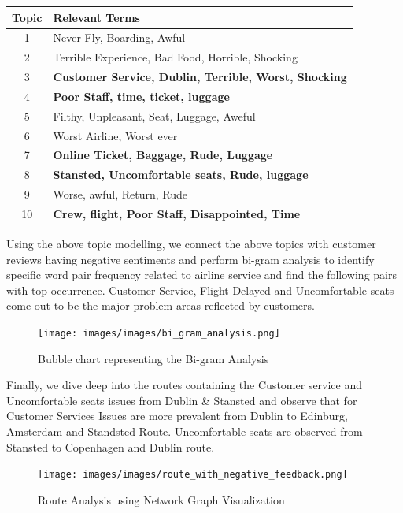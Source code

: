 \documentclass[11pt]{article} %
\begin{document}
\begin{table}[H]
\centering
\begin{tabular}{@{}cl@{}}
\toprule
\multicolumn{1}{l}{\textbf{Topic}} & \textbf{Relevant Terms}                                      \\ \midrule
1                                  & Never Fly, Boarding,   Awful                                \\
2                                  & Terrible Experience, Bad Food, Horrible, Shocking            \\
3                                  & \textbf{Customer Service, Dublin, Terrible, Worst, Shocking} \\
4                                  & \textbf{Poor Staff, time, ticket,   luggage}                 \\
5                                  & Filthy, Unpleasant, Seat, Luggage, Aweful                    \\
6                                  & Worst Airline, Worst ever                                    \\
7                                  & \textbf{Online Ticket, Baggage,   Rude, Luggage}             \\
8                                  & \textbf{Stansted, Uncomfortable   seats, Rude, luggage}      \\
9                                  & Worse, awful, Return, Rude                                  \\
10                                 & \textbf{Crew, flight, Poor Staff,   Disappointed, Time}      \\ \bottomrule
\end{tabular}
\end{table}
Using the above topic modelling, we connect the above topics with customer reviews having negative sentiments and perform bi-gram analysis to identify specific word pair frequency related to airline service and find the following pairs with top occurrence. Customer Service,  Flight Delayed and Uncomfortable seats come out to be the major problem areas reflected by customers.
\begin{figure}[H]
    \centering
    \texttt{[image: images/images/bi\_gram\_analysis.png]}
    \caption{Bubble chart representing the Bi-gram Analysis}
    \label{fig:Bigram Analysis}
\end{figure}
Finally, we dive deep into the routes containing the Customer service and Uncomfortable seats issues from Dublin \& Stansted and observe that for Customer Services Issues are more prevalent from Dublin to Edinburg, Amsterdam and Standsted Route. Uncomfortable seats are observed from Stansted to Copenhagen and Dublin route.
\begin{figure}[H]
    \centering
    \texttt{[image: images/images/route\_with\_negative\_feedback.png]}
    \caption{Route Analysis using Network Graph Visualization}
    \label{fig:Route Analysis using Network Graph Visualization}
\end{figure}
\end{document}
